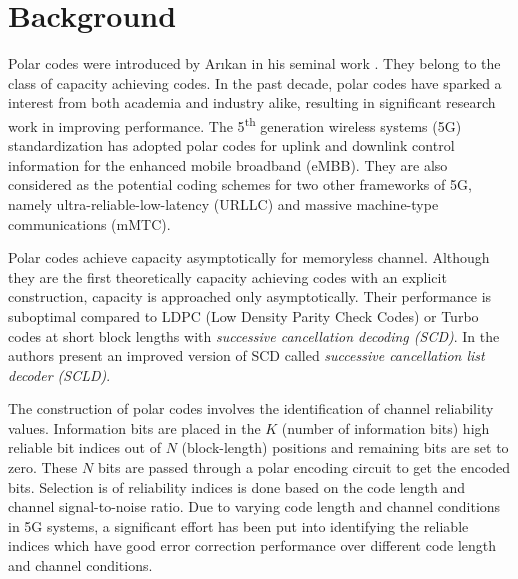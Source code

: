 \chapter{Background} \label{chap:Background}

\setcounter{secnumdepth}{3}
\renewcommand{\thesubsubsection}{\Alph{subsubsection}}



Polar codes were introduced by Ar\i kan in his seminal work \cite{Arikan}. They belong to the class of capacity achieving codes. In the past decade, polar codes have sparked a interest from both academia and industry alike, resulting in significant research work in improving performance. The 5\textsuperscript{th} generation wireless systems (5G) standardization has adopted polar codes for uplink and downlink control information for the enhanced mobile broadband (eMBB). They are also considered as the potential coding schemes for two other frameworks of 5G, namely ultra-reliable-low-latency (URLLC) and massive machine-type communications (mMTC).

Polar codes achieve capacity asymptotically for memoryless channel. Although they are the first theoretically capacity achieving codes with an explicit construction, capacity is approached only asymptotically. Their performance is suboptimal compared to LDPC (Low Density Parity Check Codes) or Turbo codes at short block lengths with \emph{successive cancellation decoding (SCD)}. In \cite{SCL} the authors present an improved version of SCD called \emph{successive cancellation list decoder (SCLD)}.

The construction of polar codes involves the identification of channel reliability values. Information bits are placed in the $ K $ (number of information bits) high reliable bit indices out of $ N $ (block-length) positions and remaining bits are set to zero. These $ N $ bits are passed through a polar encoding circuit to get the encoded bits. Selection is of reliability indices is done based on the code length and channel signal-to-noise ratio. Due to varying code length and channel conditions in 5G systems, a significant effort has been put into identifying the reliable indices which have good error correction performance over different code length and channel conditions.

